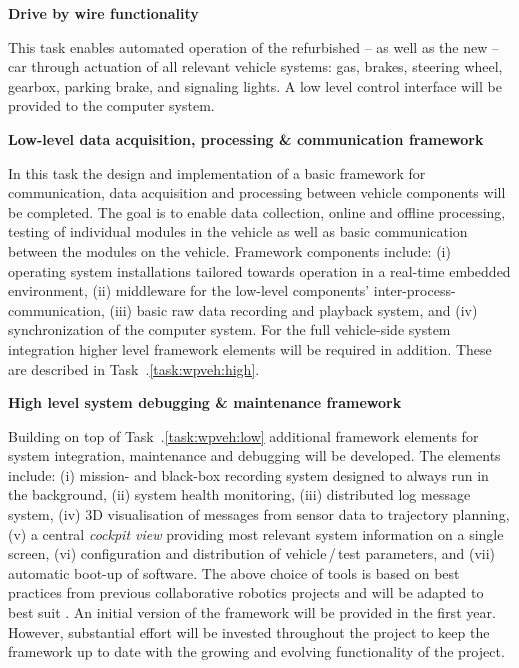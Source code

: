 {\begin{tasks}{\WPVehicleNo}
\item  {\bf Drive by wire functionality}
  \taskpartner{\VW}

This task enables automated operation of the refurbished -- as well as the new -- car through actuation of all relevant vehicle systems: gas, brakes, steering wheel, gearbox, parking brake, and signaling lights. A low level control interface will be provided to the computer system. 

\item  {\bf Low-level data acquisition, processing \& communication framework}
	\label{task:wpveh:low}

In this task the design and implementation of a basic framework for communication, data acquisition and processing between vehicle components will be completed. The goal is to enable data collection, online and offline processing, testing of individual modules in the vehicle as well as basic communication between the modules on the vehicle. Framework components include: (i) operating system installations tailored towards operation in a real-time embedded environment, (ii) middleware for the low-level components' inter-process-communication, (iii) basic raw data recording and playback system, and (iv) synchronization of the computer system. For the full vehicle-side system integration higher level framework elements will be required in addition. These are described in Task~\WPVehicleNo.\ref{task:wpveh:high}.

\item {\bf High level system debugging \& maintenance framework}
	\label{task:wpveh:high}

Building on top of Task~\WPVehicleNo.\ref{task:wpveh:low} additional framework elements for system integration, maintenance and debugging will be developed. The elements include: (i) mission- and black-box recording system designed to always run in the background, (ii) system health monitoring, (iii) distributed log message system, (iv) 3D visualisation of messages from sensor data to trajectory planning, (v) a central \emph{cockpit view} providing most relevant system information on a single screen, (vi) configuration and distribution of vehicle\,/\,test parameters, and (vii) automatic boot-up of software. The above choice of tools is based on best practices from previous collaborative robotics projects and will be adapted to best suit \Project{}.
An initial version of the framework will be provided in the first year. However, substantial effort will be invested throughout the project to keep the framework up to date with the growing and evolving functionality of the project.


\end{tasks}}
